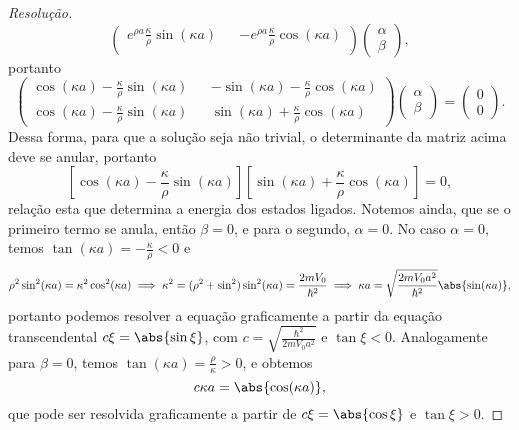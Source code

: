\begin{proof}[Resolução]
\begin{equation*}
\begin{pmatrix}
            e^{\rho a} \frac{\kappa}{\rho}\sin(\kappa a) && -e^{\rho a}\frac{\kappa}{\rho}\cos(\kappa a)\\
        \end{pmatrix}
        \begin{pmatrix}
            \alpha\\
            \beta
        \end{pmatrix},
    \end{equation*}
    portanto
    \begin{equation*}
        \begin{pmatrix}
            \cos(\kappa a) - \frac{\kappa}{\rho} \sin(\kappa a) && - \sin(\kappa a) - \frac{\kappa}{\rho}\cos(\kappa a)\\
            \cos(\kappa a) - \frac{\kappa}{\rho} \sin(\kappa a) && \sin(\kappa a) + \frac{\kappa}{\rho}\cos(\kappa a)
        \end{pmatrix}
        \begin{pmatrix}
            \alpha\\
            \beta
        \end{pmatrix} =
        \begin{pmatrix}
            0\\
            0
        \end{pmatrix}.
    \end{equation*}
    Dessa forma, para que a solução seja não trivial, o determinante da matriz acima deve se anular, portanto
    \begin{equation*}
        \left[\cos(\kappa a) - \frac{\kappa}{\rho}\sin(\kappa a)\right]\left[\sin(\kappa a) + \frac{\kappa}{\rho}\cos(\kappa a)\right] = 0,
    \end{equation*}
    relação esta que determina a energia dos estados ligados. Notemos ainda, que se o primeiro termo se anula, então \(\beta = 0\), e para o segundo, \(\alpha = 0\). No caso \(\alpha = 0\), temos \(\tan(\kappa a) = - \frac{\kappa}{\rho} < 0\) e
    \begin{equation*}
        \rho^2 \sin^2(\kappa a) = \kappa^2 \cos^2(\kappa a) \implies \kappa^2 = (\rho^2 + \sin^2)\sin^2(\kappa a) = \frac{2m V_0}{\hbar^2} \implies \kappa a = \sqrt{\frac{2m V_0 a^2}{\hbar^2}}\abs{\sin(\kappa a)},
    \end{equation*}
    portanto podemos resolver a equação graficamente a partir da equação transcendental \(c \xi = \abs{\sin\xi}\), com \(c = \sqrt{\frac{\hbar^2}{2m V_0 a^2}}\) e \(\tan\xi < 0\). Analogamente para \(\beta = 0\), temos \(\tan(\kappa a) = \frac{\rho}{\kappa} > 0\), e obtemos
    \begin{equation*}
        c \kappa a = \abs{\cos(\kappa a)},
    \end{equation*}
    que pode ser resolvida graficamente a partir de \(c \xi = \abs{\cos\xi}\) e \(\tan\xi > 0\).


\end{proof}
